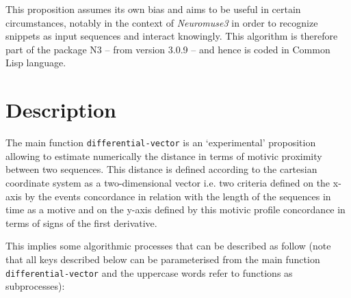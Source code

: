 \bigskip

This proposition assumes its own bias and aims to be useful in certain circumstances, notably in the context of \textsl{Neuromuse3} in order to recognize snippets as input sequences and interact knowingly. This algorithm is therefore part of the package N3 -- from version 3.0.9 -- and hence is coded in Common Lisp language. 

\section{Description}

The main function \texttt{differential-vector} is an `experimental' proposition allowing to estimate numerically the distance in terms of motivic proximity between two sequences. This distance is defined according to the cartesian coordinate system as a two-dimensional vector i.e. two criteria defined on the x-axis by the events concordance in relation with the length of the sequences in time as a motive and on the y-axis defined by this motivic profile concordance in terms of signs of the first derivative. 

\bigskip

This implies some algorithmic processes that can be described as follow  (note that all keys described below can be parameterised from the main function \texttt{differential-vector} and the uppercase words refer to functions as subprocesses):


